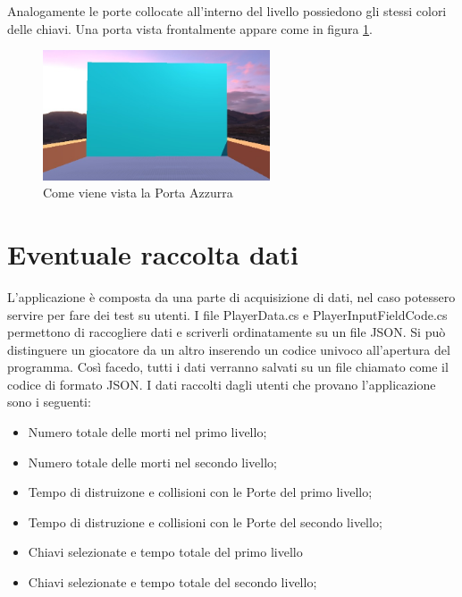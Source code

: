 \documentclass[target=bach,aauheader=]{thud}
\begin{document}
Analogamente le porte collocate all'interno del livello possiedono gli stessi colori delle chiavi.
Una porta vista frontalmente appare come in figura \ref{fig:door}.

\begin{figure}[h]
    \centering
    \includegraphics[width=0.60\textwidth]{door}
    \caption{Come viene vista la Porta Azzurra}
    \label{fig:door}
\end{figure}

\section{Eventuale raccolta dati}
L'applicazione è composta da una parte di acquisizione di dati, nel caso potessero servire per fare dei test su utenti.
I file PlayerData.cs e PlayerInputFieldCode.cs permettono di raccogliere dati e scriverli ordinatamente su un file JSON.
Si può distinguere un giocatore da un altro inserendo un codice univoco all'apertura del programma.
Così facedo, tutti i dati verranno salvati su un file chiamato come il codice di formato JSON.
I dati raccolti dagli utenti che provano l'applicazione sono i seguenti:
\begin{itemize}
    \item Numero totale delle morti nel primo livello;
    \item Numero totale delle morti nel secondo livello;
    \item Tempo di distruizone e collisioni con le Porte del primo livello;
    \item Tempo di distruzione e collisioni con le Porte del secondo livello;
    \item Chiavi selezionate e tempo totale del primo livello
    \item Chiavi selezionate e tempo totale del secondo livello;
\end{itemize}
\end{document}
